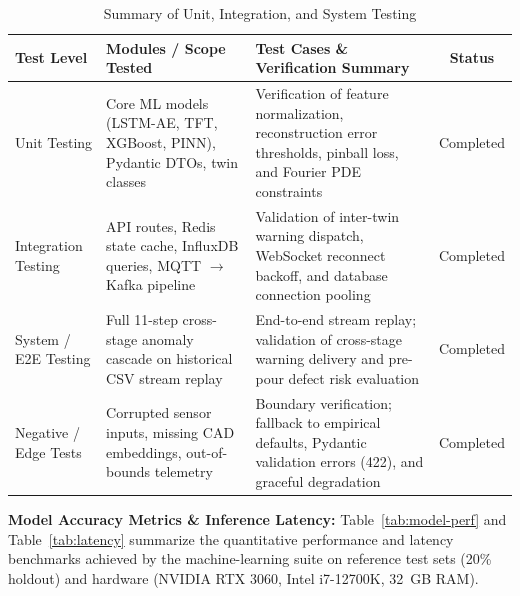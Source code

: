 \documentclass[11pt, a4paper]{article}
\begin{document}
\begin{table}[H]
    \centering
    \footnotesize
    \renewcommand{\arraystretch}{1.25}
    \begin{tabular}{|p{2.8cm}|p{4.2cm}|p{4.8cm}|c|}
        \hline
        \textbf{Test Level} & \textbf{Modules / Scope Tested} & \textbf{Test Cases \& Verification Summary} & \textbf{Status} \\
        \hline
        Unit Testing & Core ML models (LSTM-AE, TFT, XGBoost, PINN), Pydantic DTOs, twin classes & Verification of feature normalization, reconstruction error thresholds, pinball loss, and Fourier PDE constraints & Completed \\
        \hline
        Integration Testing & API routes, Redis state cache, InfluxDB queries, MQTT $\rightarrow$ Kafka pipeline & Validation of inter-twin warning dispatch, WebSocket reconnect backoff, and database connection pooling & Completed \\
        \hline
        System / E2E Testing & Full 11-step cross-stage anomaly cascade on historical CSV stream replay & End-to-end stream replay; validation of cross-stage warning delivery and pre-pour defect risk evaluation & Completed \\
        \hline
        Negative / Edge Tests & Corrupted sensor inputs, missing CAD embeddings, out-of-bounds telemetry & Boundary verification; fallback to empirical defaults, Pydantic validation errors (422), and graceful degradation & Completed \\
        \hline
    \end{tabular}
    \caption{Summary of Unit, Integration, and System Testing}
    \label{tab:testing-summary}
\end{table}

\noindent
\textbf{Model Accuracy Metrics \& Inference Latency:} Table~\ref{tab:model-perf} and Table~\ref{tab:latency} summarize the quantitative performance and latency benchmarks achieved by the machine-learning suite on reference test sets (20\% holdout) and hardware (NVIDIA RTX 3060, Intel i7-12700K, 32~GB RAM).
\end{document}
